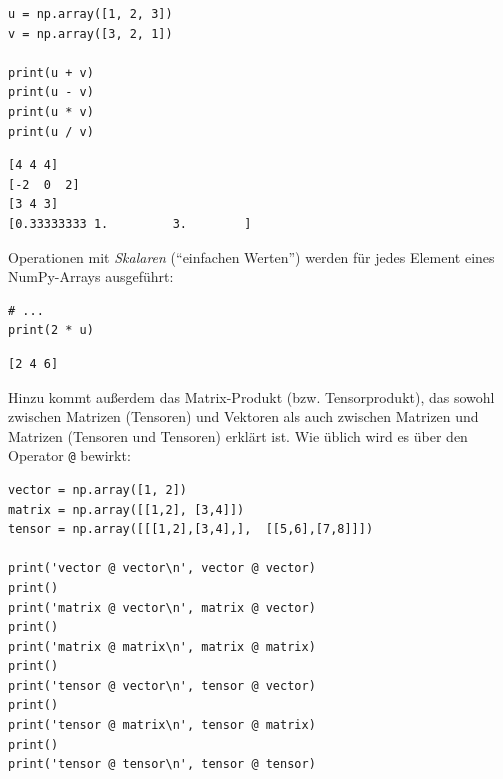 \begin{tcbraster}[raster columns=2,
                  raster equal height,
                  nobeforeafter,
                  raster column skip=0.5cm]
\begin{codebox}
\begin{verbatim}
u = np.array([1, 2, 3])
v = np.array([3, 2, 1])

print(u + v)
print(u - v)
print(u * v)
print(u / v)
\end{verbatim}
\end{codebox}
%
\begin{cmdbox}
\begin{verbatim}
[4 4 4]
[-2  0  2]
[3 4 3]
[0.33333333 1.         3.        ]
\end{verbatim}
\end{cmdbox}
\end{tcbraster}

Operationen mit \emph{Skalaren} (\enquote{einfachen Werten}) werden für jedes Element eines NumPy-Arrays ausgeführt:

\begin{tcbraster}[raster columns=2,
                  raster equal height,
                  nobeforeafter,
                  raster column skip=0.5cm]
\begin{codebox}
\begin{verbatim}
# ...
print(2 * u)
\end{verbatim}
\end{codebox}
%
\begin{cmdbox}
\begin{verbatim}
[2 4 6]
\end{verbatim}
\end{cmdbox}
\end{tcbraster}

Hinzu kommt außerdem das Matrix-Produkt (bzw. Tensorprodukt), das sowohl zwischen Matrizen (Tensoren) und Vektoren als auch zwischen Matrizen und Matrizen (Tensoren und Tensoren) erklärt ist. Wie üblich wird es über den Operator \texttt{@} bewirkt:

\begin{codebox}
\begin{verbatim}
vector = np.array([1, 2])
matrix = np.array([[1,2], [3,4]])
tensor = np.array([[[1,2],[3,4],],  [[5,6],[7,8]]])

print('vector @ vector\n', vector @ vector)
print()
print('matrix @ vector\n', matrix @ vector)
print()
print('matrix @ matrix\n', matrix @ matrix)
print()
print('tensor @ vector\n', tensor @ vector)
print()
print('tensor @ matrix\n', tensor @ matrix)
print()
print('tensor @ tensor\n', tensor @ tensor)
\end{verbatim}
\end{codebox}

